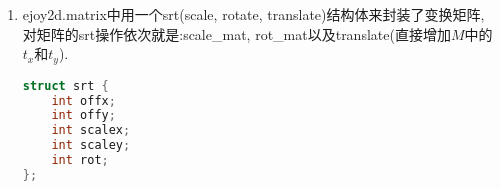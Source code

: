 {\begin {enumerate}
{        在\eqref{transform_rotate}这种情况下, $M$退化为旋转矩阵, 此处代码的原理也很容易理解:
        \begin{equation}
            M *
            \begin{bmatrix}
                cos\theta  &  sin\theta  &   0\\
                -sin\theta &  -cos\theta &   0\\
                0          &  0          &   1
            \end{bmatrix}\\
            =
            \begin{bmatrix}
                cos\theta*a - sin\theta*b     & sin\theta*a + cos\theta*b     & 0\\
                cos\theta*c - sin\theta*d     & sin\theta*c + cos\theta*d     & 0\\
                cos\theta*t_x - sin\theta*t_y & sin\theta*t_x + cos\theta*t_y & 1
            \end{bmatrix}
        \end{equation}

        代码中的$d$是经过变换的角度, 这个在lua的接口中有体现, 源码截取如下:
        \begin{lstlisting}[language={[ANSI]C}]
double r = luaL_checknumber(L,2);
matrix_rot(m, r * (1024.0 / 360.0));
        \end{lstlisting}

        代码中对角度的计算做了一个$cos$表, $cos$和$sin$的计算都是通过查表来得到的, 代码中做$sin$计算时的64, 是$sin\theta = cos(90 - \theta)$经过1024换算后得到的.
        \begin{lstlisting}[language={[ANSI]C}]
static inline int
icost(int dd) {
    static int t[256] = {
    ...
    };
    if (dd < 0) {
        dd = 256 - (-dd % 256);
    } else {
        dd %= 256;
    }

    return t[dd];
}

static inline int
icosd(int d) {
    int dd = d/4;
    return icost(dd);
}

static inline int
isind(int d) {
    int dd = 64 - d/4;
    return icost(dd);
}
        \end{lstlisting}
    }

    \gaccobsplitinv

    \item{ {}\par
        ejoy2d.matrix中用一个srt(scale, rotate, translate)结构体来封装了变换矩阵, 对矩阵的srt操作依次就是:scale\_mat, rot\_mat以及translate(直接增加$M$中的$t_x$和$t_y$).
        \begin{lstlisting}[language=C]
struct srt {
	int offx;
	int offy;
	int scalex;
	int scaley;
	int rot;
};


\end{lstlisting}}
\end{enumerate}}
